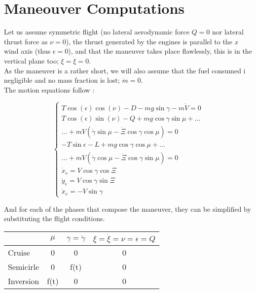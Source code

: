 \section*{Maneouver Computations}
Let us assume symmetric flight (no lateral aerodynamic force $Q=0$ nor lateral thrust force as $\nu=0$), the thrust generated by the engines is parallel to the \textit{x} wind axis (thus $\epsilon=0$),  and that the maneuver takes place flawlessly, this is in the vertical plane too; $\xi=\dot{\xi}=0$.\\
As the maneuver is a rather short, we will also assume that the fuel consumed i negligible and no mass fraction is lost; $\dot{m}=0$.\\
The motion equations follow \cite{tierno}:

\begin{equation*}
	\begin{cases}
	T\cos(\epsilon)\cos(\nu) - D -mg\sin\gamma-m\dot{V}=0\\
	T\cos(\epsilon)\sin(\nu) - Q+mg\cos\gamma\sin\mu+...\\
	...+mV(\dot{\gamma}\sin\mu-\dot{\Xi}\cos\gamma\cos\mu)=0\\
	-T\sin\epsilon-L+mg\cos\gamma\cos\mu+...\\
	...+mV(\dot{\gamma}\cos\mu-\dot{\Xi}\cos\gamma\sin\mu)=0\\
	\dot{x}_e=V\cos\gamma\cos\Xi\\
	\dot{y}_e=V\cos\gamma\sin\Xi\\
	\dot{x}_e=-V\sin\gamma
	\end{cases}
\end{equation*}

And for each of the phases that compose the maneuver, they can be simplified by substituting the flight conditions.

\begin{center}
\begin{tabular}{|l|c|c|c|}\hline
	& $\mu$ & $\gamma=\dot{\gamma}$ & $\xi=\dot{\xi}=\nu=\epsilon=Q$\\ \hline  \hline
	Cruise & 0 & 0 & 0 \\ \hline
	Semicirle & 0 & f(t) & 0 \\ \hline
	Inversion& f(t) & 0 & 0 \\ \hline
\end{tabular}
\end{center}

